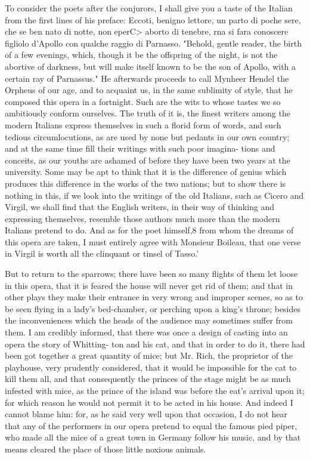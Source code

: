 To consider the poets after the conjurors, I shall give you a taste of the Italian from the first lines of his preface: Eccoti, benigno lettore, un parto di poche sere, che se ben nato di notte, non eperC> aborto di tenebre, rna si fara conoscere figliolo d'Apollo con qualche raggio di Parnasso. "Behold, gentle reader, the birth of a few evenings, which, though it be the offspring of the night, is not the abortive of darkness, but will make itself known to be the son of Apollo, with a certain ray of Parnassus." He afterwards proceeds to call Mynheer Hendel the Orpheus of our age, and to acquaint us, in the same sublimity of style, that he composed this opera in a fortnight. Such are the wits to whose tastes we so ambitiously conform ourselves. The truth of it is, the finest writers among the modern Italians express themselves in such a florid form of words, and such tedious circumlocutions, as are used by none but pedants in our own country; and at the same time fill their writings with such poor imagina- tions and conceits, as our youths are ashamed of before they have been two years at the university. Some may be apt to think that it is the difference of genius which produces this difference in the works of the two nations; but to show there is nothing in this, if we look into the writings of the old Italians, such as Cicero and Virgil, we shall find that the English writers, in their way of thinking and expressing themselves, resemble those authors much more than the modern Italians pretend to do. And as for the poet himself,8 from whom the dreams of this opera are taken, I must entirely agree with Monsieur Boileau, that one verse in Virgil is worth all the clinquant or tinsel of Tasso.'

But to return to the sparrows; there have been so many flights of them let loose in this opera, that it is feared the house will never get rid of them; and that in other plays they make their entrance in very wrong and improper scenes, so as to be seen flying in a lady's bed-chamber, or perching upon a king's throne; besides the inconveniences which the heads of the audience may sometimes suffer from them. I am credibly informed, that there was once a design of casting into an opera the story of Whitting- ton and his cat, and that in order to do it, there had been got together a great quantity of mice; but Mr. Rich, the proprietor of the playhouse, very prudently considered, that it would be impossible for the cat to kill them all, and that consequently the princes of the stage might be as much infested with mice, as the prince of the island was before the eat's arrival upon it; for which reason he would not permit it to be acted in his house. And indeed I cannot blame him: for, as he said very well upon that occasion, I do not hear that any of the performers in our opera pretend to equal the famous pied piper, who made all the mice of a great town in Germany follow his music, and by that means cleared the place of those little noxious animals.

